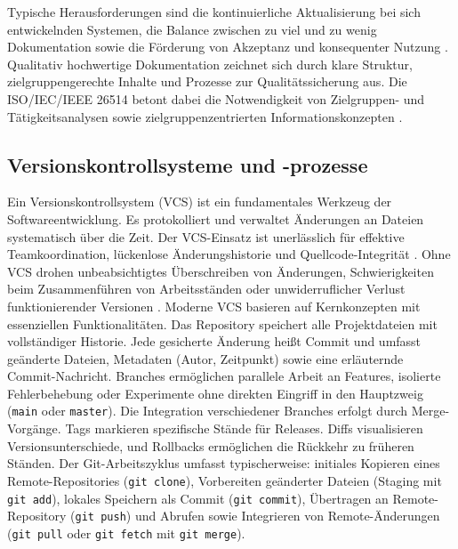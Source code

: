 \documentclass[12pt,oneside]{article}
\begin{document}
    Typische Herausforderungen sind die kontinuierliche Aktualisierung bei sich entwickelnden Systemen, die Balance zwischen zu viel und zu wenig Dokumentation sowie die Förderung von Akzeptanz und konsequenter Nutzung \cite{webmakers2024}.
    Qualitativ hochwertige Dokumentation zeichnet sich durch klare Struktur, zielgruppengerechte Inhalte und Prozesse zur Qualitätssicherung aus.
    Die ISO/IEC/IEEE 26514 betont dabei die Notwendigkeit von Zielgruppen- und Tätigkeitsanalysen sowie zielgruppenzentrierten Informationskonzepten \cite{styrz2022normen}.

    \subsection{Versionskontrollsysteme und -prozesse}
    \label{subsec:versionskontrolle}
    Ein Versionskontrollsystem (VCS) ist ein fundamentales Werkzeug der Softwareentwicklung. Es protokolliert und verwaltet Änderungen an Dateien systematisch über die Zeit. Der VCS-Einsatz ist unerlässlich für effektive Teamkoordination, lückenlose Änderungshistorie und Quellcode-Integrität \cite{ChaconStraubProGit}. Ohne VCS drohen unbeabsichtigtes Überschreiben von Änderungen, Schwierigkeiten beim Zusammenführen von Arbeitsständen oder unwiderruflicher Verlust funktionierender Versionen \cite{moldstud2024}.
    \newline
    Moderne VCS basieren auf Kernkonzepten mit essenziellen Funktionalitäten. Das Repository speichert alle Projektdateien mit vollständiger Historie. Jede gesicherte Änderung heißt Commit und umfasst geänderte Dateien, Metadaten (Autor, Zeitpunkt) sowie eine erläuternde Commit-Nachricht. Branches ermöglichen parallele Arbeit an Features, isolierte Fehlerbehebung oder Experimente ohne direkten Eingriff in den Hauptzweig (\texttt{main} oder \texttt{master}). Die Integration verschiedener Branches erfolgt durch Merge-Vorgänge. Tags markieren spezifische Stände für Releases. Diffs visualisieren Versionsunterschiede, und Rollbacks ermöglichen die Rückkehr zu früheren Ständen.
    \newline
    Der Git-Arbeitszyklus umfasst typischerweise: initiales Kopieren eines Remote-Repositories (\texttt{git clone}), Vorbereiten geänderter Dateien (Staging mit \texttt{git add}), lokales Speichern als Commit (\texttt{git commit}), Übertragen an Remote-Repository (\texttt{git push}) und Abrufen sowie Integrieren von Remote-Änderungen (\texttt{git pull} oder \texttt{git fetch} mit \texttt{git merge}).
\end{document}
